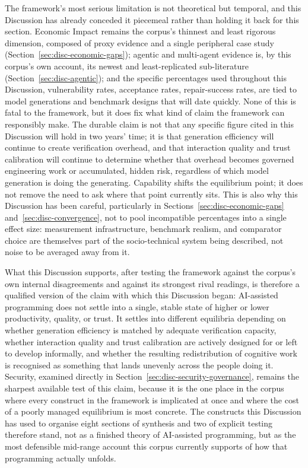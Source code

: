 The framework's most serious limitation is not theoretical but temporal, and this Discussion has already conceded it piecemeal rather than holding it back for this section. Economic Impact remains the corpus's thinnest and least rigorous dimension, composed of proxy evidence and a single peripheral case study (Section~\ref{sec:disc-economic-gaps}); agentic and multi-agent evidence is, by this corpus's own account, its newest and least-replicated sub-literature (Section~\ref{sec:disc-agentic}); and the specific percentages used throughout this Discussion, vulnerability rates, acceptance rates, repair-success rates, are tied to model generations and benchmark designs that will date quickly. None of this is fatal to the framework, but it does fix what kind of claim the framework can responsibly make. The durable claim is not that any specific figure cited in this Discussion will hold in two years' time; it is that generation efficiency will continue to create verification overhead, and that interaction quality and trust calibration will continue to determine whether that overhead becomes governed engineering work or accumulated, hidden risk, regardless of which model generation is doing the generating. Capability shifts the equilibrium point; it does not remove the need to ask where that point currently sits. This is also why this Discussion has been careful, particularly in Sections~\ref{sec:disc-economic-gaps} and~\ref{sec:disc-convergence}, not to pool incompatible percentages into a single effect size: measurement infrastructure, benchmark realism, and comparator choice are themselves part of the socio-technical system being described, not noise to be averaged away from it.

What this Discussion supports, after testing the framework against the corpus's own internal disagreements and against its strongest rival readings, is therefore a qualified version of the claim with which this Discussion began: AI-assisted programming does not settle into a single, stable state of higher or lower productivity, quality, or trust. It settles into different equilibria depending on whether generation efficiency is matched by adequate verification capacity, whether interaction quality and trust calibration are actively designed for or left to develop informally, and whether the resulting redistribution of cognitive work is recognised as something that lands unevenly across the people doing it. Security, examined directly in Section~\ref{sec:disc-security-governance}, remains the sharpest available test of this claim, because it is the one place in the corpus where every construct in the framework is implicated at once and where the cost of a poorly managed equilibrium is most concrete. The constructs this Discussion has used to organise eight sections of synthesis and two of explicit testing therefore stand, not as a finished theory of AI-assisted programming, but as the most defensible mid-range account this corpus currently supports of how that programming actually unfolds.

